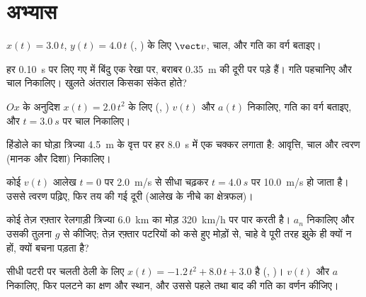 \section{अभ्यास}

\begin{exercise}[$\star$]\label{exo:g12:kinematics-2d:1}
$x(t) = 3.0\,t$, $y(t) = 4.0\,t$ (, ) के लिए $\vect v$, चाल, 
और गति का वर्ग बताइए।
\end{exercise}

\begin{exercise}[$\star$]\label{exo:g12:kinematics-2d:2}
हर \qty{0.10}{s} पर लिए गए  में बिंदु एक रेखा पर, बराबर
\qty{0.35}{m} की दूरी पर पड़े हैं। गति पहचानिए और चाल निकालिए। खुलते
अंतराल किसका संकेत होते?
\end{exercise}

\begin{exercise}[$\star$]\label{exo:g12:kinematics-2d:3}
$Ox$ के अनुदिश $x(t) = 2.0\,t^2$ के लिए (, ) $v(t)$ और $a(t)$ निकालिए,
गति का वर्ग बताइए, और $t = \qty{3.0}{s}$ पर चाल निकालिए।
\end{exercise}

\begin{exercise}[$\star$]\label{exo:g12:kinematics-2d:4}
हिंडोले का घोड़ा त्रिज्या \qty{4.5}{m} के वृत्त पर हर \qty{8.0}{s} में एक चक्कर लगाता
है: आवृत्ति, चाल और त्वरण (मानक और दिशा) निकालिए।
\end{exercise}

\begin{exercise}[$\star$]\label{exo:g12:kinematics-2d:5}
कोई $v(t)$ आलेख $t = 0$ पर \qty{2.0}{m/s} से सीधा चढ़कर $t = \qty{4.0}{s}$ पर \qty{10.0}{m/s} हो जाता
है। उससे त्वरण पढ़िए, फिर तय की गई दूरी (आलेख के नीचे का क्षेत्रफल)।
\end{exercise}

\begin{exercise}[$\star\star$]\label{exo:g12:kinematics-2d:6}
कोई तेज़ रफ़्तार रेलगाड़ी त्रिज्या \qty{6.0}{km} का मोड़ \qty{320}{km/h} पर पार
करती है। $a_n$ निकालिए और उसकी तुलना $g$ से कीजिए; तेज़ रफ़्तार
पटरियों को कसे हुए मोड़ों से, चाहे वे पूरी तरह झुके ही क्यों न हों, क्यों
बचना पड़ता है?
\end{exercise}

\begin{exercise}[$\star\star$]\label{exo:g12:kinematics-2d:7}
सीधी पटरी पर चलती ठेली के लिए $x(t) = -1.2\,t^2 + 8.0\,t + 3.0$ है (, )। $v(t)$ और $a$
निकालिए, फिर पलटने का क्षण और स्थान, और उससे पहले तथा बाद की गति का वर्णन
कीजिए।
\end{exercise}

